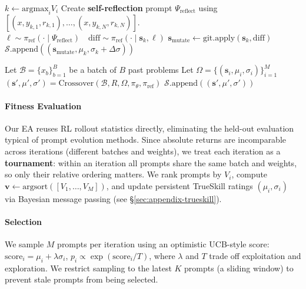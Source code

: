 \documentclass{article}
\theoremstyle{plain}
\theoremstyle{definition}
\theoremstyle{remark}
\begin{document}
\begin{algorithm}[t]
\begin{algorithmic}
      \STATE $k\leftarrow \mathrm{argmax}_{i} V_{i}$ \hfill {}
      \STATE Create {\color{magenta}\textbf{{} self-reflection}} prompt $\Psi_{\text{reflect}}$ using $[(x, y_{k,1}, r_{k,1}), \dots, (x, y_{k,N}, r_{k,N})]$.
      \STATE $\ell \sim \pi_{\text{ref}}(\cdot \mid \Psi_{\text{reflect}}) \quad \mathrm{diff} \sim \pi_{\text{ref}}(\cdot \mid \mathbf{s}_{k}, \ell)$
      \STATE $\mathbf{s}_{\text{mutate}} \leftarrow \mathrm{git}.\mathrm{apply}(\mathbf{s}_{k}, \mathrm{diff})$ \hfill {}
      \STATE $\mathcal{S}.\mathrm{append}((\mathbf{s}_{\text{mutate}}, \mu_{k}, \sigma_{k} + \Delta\sigma))$
      \vspace{5pt}

          \STATE Let $\mathcal{B} = \{ x_{b} \}_{b=1}^{B}$ be a batch of $B$ past problems
          \STATE Let $\Omega=\{(\mathbf{s}_{i}, \mu_i, \sigma_i)\}_{i=1}^{M}$
          \STATE $(\mathbf{s}', \mu', \sigma')=\mathrm{Crossover}(\mathcal{B}, R, \Omega, \pi_{\theta}, \pi_{\text{ref}} )$ \hfill  {}
          \STATE $\mathcal{S}.\mathrm{append}((\mathbf{s}', \mu', \sigma'))$
      \ENDIF
      \ENDWHILE
    \end{algorithmic}
  \end{algorithm}
\vspace{-12pt}

\paragraph{Fitness Evaluation}
Our EA reuses RL rollout statistics directly, eliminating the held-out evaluation typical of prompt evolution methods. Since absolute returns are incomparable across iterations (different batches and weights), we treat each iteration as a \textbf{tournament}: within an iteration all prompts share the same batch and weights, so only their relative ordering matters. We rank prompts by $V_i$, compute $\mathbf{v} \leftarrow \mathrm{argsort}([V_{1},\dots, V_{M}])$, and update persistent TrueSkill \citep{trueskill} ratings $(\mu_i, \sigma_i)$ via Bayesian message passing (see \S\ref{sec:appendix-trueskill}).

\vspace{-5pt}
\paragraph{Selection} We sample $M$ prompts per iteration using an optimistic UCB-style score: $\mathrm{score}_{i} = \mu_{i}+\lambda \sigma_{i}$, $p_{i} \propto \exp ( \mathrm{score}_{i} /T )$\label{eq:selection-equation}, where $\lambda$ and $T$ trade off exploitation and exploration. We restrict sampling to the latest $K$ prompts (a sliding window) to prevent stale prompts from being selected.
\end{document}
